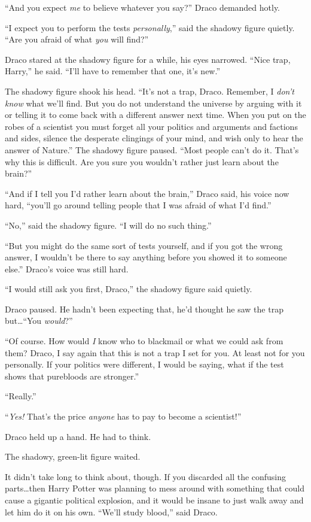 “And you expect \emph{me} to believe whatever you say?” Draco demanded hotly.

“I expect you to perform the tests \emph{personally},” said the shadowy figure quietly. “Are you afraid of what \emph{you} will find?”

Draco stared at the shadowy figure for a while, his eyes narrowed. “Nice trap, Harry,” he said. “I’ll have to remember that one, it’s new.”

The shadowy figure shook his head. “It’s not a trap, Draco. Remember, I \emph{don’t know} what we’ll find. But you do not understand the universe by arguing with it or telling it to come back with a different answer next time. When you put on the robes of a scientist you must forget all your politics and arguments and factions and sides, silence the desperate clingings of your mind, and wish only to hear the answer of Nature.” The shadowy figure paused. “Most people can’t do it. That’s why this is difficult. Are you sure you wouldn’t rather just learn about the brain?”

“And if I tell you I’d rather learn about the brain,” Draco said, his voice now hard, “you’ll go around telling people that I was afraid of what I’d find.”

“No,” said the shadowy figure. “I will do no such thing.”

“But you might do the same sort of tests yourself, and if you got the wrong answer, I wouldn’t be there to say anything before you showed it to someone else.” Draco’s voice was still hard.

“I would still ask you first, Draco,” the shadowy figure said quietly.

Draco paused. He hadn’t been expecting that, he’d thought he saw the trap but…“You \emph{would}?”

“Of course. How would \emph{I} know who to blackmail or what we could ask from them? Draco, I say again that this is not a trap I set for you. At least not for you personally. If your politics were different, I would be saying, what if the test shows that purebloods are stronger.”

“Really.”

“\emph{Yes!} That’s the price \emph{anyone} has to pay to become a scientist!”

Draco held up a hand. He had to think.

The shadowy, green-lit figure waited.

It didn’t take long to think about, though. If you discarded all the confusing parts…then Harry Potter was planning to mess around with something that could cause a gigantic political explosion, and it would be insane to just walk away and let him do it on his own. “We’ll study blood,” said Draco.

